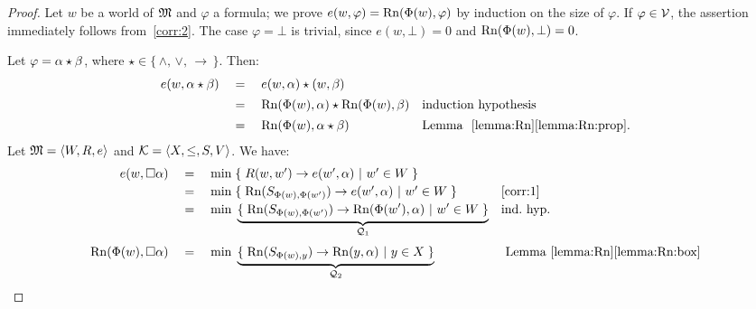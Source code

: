 \begin{proof}
Let $w$ be a world of $\mathfrak{M}$  and $\varphi$ a formula; we prove  $e(w,\varphi) =\mathrm{Rn}(\Phi(w),\varphi)$
  by induction on the size of $\varphi$. If $\varphi\in\mathcal{V}$,
   the assertion immediately follows from~\ref{corr:2}.
   The case  $\varphi =\bot$ is trivial, since  $e(w,\bot)=0$
   and $\mathrm{Rn}(\Phi(w),\bot)=0$.

   Let $\varphi=\alpha\star \beta$, where $\star\in \{\,\land,\,\lor,\,\to\,\}$. Then:
   \[
     \begin{array}{lcll}
       e(w, \alpha\star \beta) & \;= \; & e(w,\alpha)\star (w,\beta) &
  \\[1ex]                                                       
 &  \;= \; &     \mathrm{Rn}(\Phi(w),\alpha)\star  \mathrm{Rn}(\Phi(w),\beta)
& \text{induction hypothesis} 
       \\[1ex]                                                      
                        &  \;= \; &  \mathrm{Rn}(\Phi(w),\alpha\star \beta)
           & \text{Lemma ~\ref{lemma:Rn}\ref{lemma:Rn:prop}}.
        \end{array}    
   \]
Let $\mathfrak{M}=\langle W,R,e \rangle$ and  $\mathcal{K}=\langle X,\leq,S,V \rangle$.
We have:
\[
  \begin{array}{rcll}
  e(w,\Box \alpha) & \;=\; & \min\; \{\; R(w,w') \to e(w',\alpha)~|~w'\in W \;\}    
&
    \\[.5ex]
 & \;=\; & \min\;\{\; \mathrm{Rn}(S_{\Phi(w),\Phi(w')} ) \to e(w',\alpha)~|~w'\in W \;\}    
&\text{\ref{corr:1}}
\\[.5ex]
 & \;=\; &
   \min\;\underbrace{\{\; \mathrm{Rn}(S_{\Phi(w),\Phi(w')} ) \to \mathrm{Rn}(\Phi(w'),\alpha)~|~w'\in W \;\}}_{\mathcal{Q}_1}                         
&\text{ind.~hyp.}
    \\[5ex]
    \mathrm{Rn}(\Phi(w),\Box \alpha)   
 & \;=\; &
           \min\;\underbrace{\{\; \mathrm{Rn}(S_{\Phi(w),y} ) \to \mathrm{Rn}(y,\alpha)~|~y\in X \;\}}_{\mathcal{Q}_2}
&\text{ Lemma~\ref{lemma:Rn}\ref{lemma:Rn:box}}
           

\end{array}\]
\end{proof}
